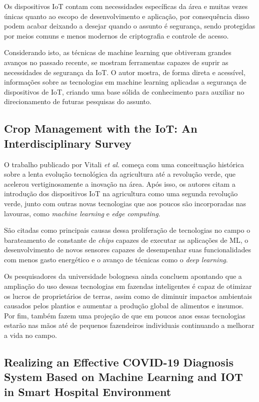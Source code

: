 \documentclass[12pt]{article}
\begin{document}
Os dispositivos IoT contam com necessidades específicas da área e muitas
vezes únicas quanto ao escopo de desenvolvimento e aplicação, por consequência disso podem acabar
deixando a desejar quando o assunto é segurança, sendo protegidas por meios comuns e menos modernos de criptografia e controle de acesso. 

Considerando isto, as técnicas de machine learning que obtiveram grandes avanços no passado recente, se
mostram ferramentas capazes de suprir as necessidades de segurança da IoT. O autor mostra, de forma direta e acessível, informações sobre as
tecnologias em machine learning aplicadas a segurança de dispositivos de IoT, criando uma base sólida de conhecimento para
auxiliar no direcionamento de futuras pesquisas do assunto.

\subsection{Crop Management with the IoT: An Interdisciplinary Survey \cite{vitali}}

O trabalho publicado por Vitali \emph{et al.} começa com uma conceituação histórica sobre a lenta evolução tecnológica da agricultura até a revolução verde, 
que acelerou vertiginosamente a inovação na área. Após isso, os autores citam a introdução dos dispositivos IoT na agricultura como uma segunda revolução verde,
junto com outras novas tecnologias que aos poucos são incorporadas nas lavouras, como \emph{machine learning} e \emph{edge computing}.

São citadas como principais causas dessa proliferação de tecnologias no campo o barateamento de constante de \emph{chips} capazes de executar as aplicações de ML, o desenvolvimento de novos sensores capazes de desempenhar suas funcionalidades com menos gasto energético e o avanço de técnicas como o \emph{deep learning}.

Os pesquisadores da universidade bolognesa ainda concluem apontando que a ampliação do uso dessas tecnologias em fazendas inteligentes é capaz de otimizar os lucros de proprietários de terras, assim como de diminuir impactos ambientais causados pelos plantios e aumentar a produção global de alimentos e insumos. Por fim, também fazem uma projeção de que em poucos anos essas tecnologias estarão nas mãos até de pequenos fazendeiros individuais continuando a melhorar a vida no campo.

\subsection{Realizing an Effective COVID-19 Diagnosis System Based on Machine Learning and IOT in Smart Hospital Environment \cite{hameed}}
\end{document}
